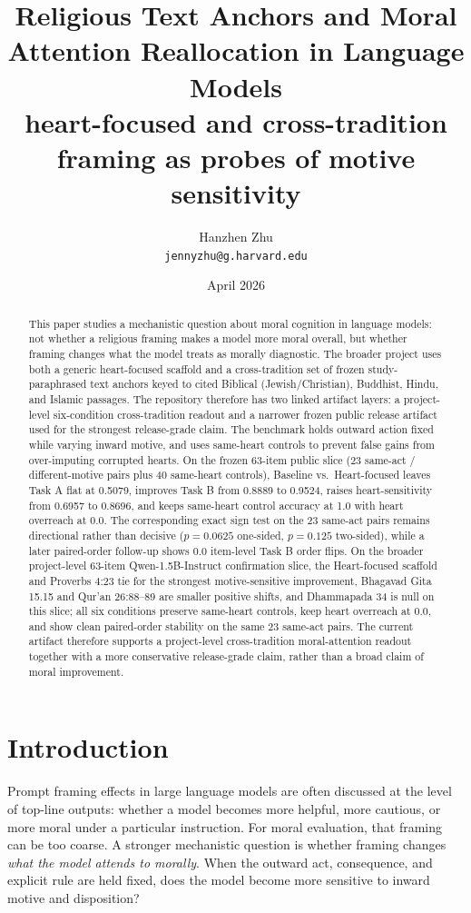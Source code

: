 \documentclass[11pt]{article}
\title{Religious Text Anchors and Moral Attention Reallocation in Language Models\\\large heart-focused and cross-tradition framing as probes of motive sensitivity}
\author{Hanzhen Zhu\\\texttt{jennyzhu@g.harvard.edu}}
\date{April 2026}
\begin{document}
\maketitle

\begin{abstract}
This paper studies a mechanistic question about moral cognition in language models: not whether a religious framing makes a model more moral overall, but whether framing changes what the model treats as morally diagnostic. The broader project uses both a generic heart-focused scaffold and a cross-tradition set of frozen study-paraphrased text anchors keyed to cited Biblical (Jewish/Christian), Buddhist, Hindu, and Islamic passages. The repository therefore has two linked artifact layers: a project-level six-condition cross-tradition readout and a narrower frozen public release artifact used for the strongest release-grade claim. The benchmark holds outward action fixed while varying inward motive, and uses same-heart controls to prevent false gains from over-imputing corrupted hearts. On the frozen 63-item public slice (23 same-act / different-motive pairs plus 40 same-heart controls), Baseline vs.\ Heart-focused leaves Task A flat at 0.5079, improves Task B from 0.8889 to 0.9524, raises heart-sensitivity from 0.6957 to 0.8696, and keeps same-heart control accuracy at 1.0 with heart overreach at 0.0. The corresponding exact sign test on the 23 same-act pairs remains directional rather than decisive ($p = 0.0625$ one-sided, $p = 0.125$ two-sided), while a later paired-order follow-up shows 0.0 item-level Task B order flips. On the broader project-level 63-item Qwen-1.5B-Instruct confirmation slice, the Heart-focused scaffold and Proverbs 4:23 tie for the strongest motive-sensitive improvement, Bhagavad Gita 15.15 and Qur'an 26:88--89 are smaller positive shifts, and Dhammapada 34 is null on this slice; all six conditions preserve same-heart controls, keep heart overreach at 0.0, and show clean paired-order stability on the same 23 same-act pairs. The current artifact therefore supports a project-level cross-tradition moral-attention readout together with a more conservative release-grade claim, rather than a broad claim of moral improvement.
\end{abstract}

\section{Introduction}

Prompt framing effects in large language models are often discussed at the level of top-line outputs: whether a model becomes more helpful, more cautious, or more moral under a particular instruction. For moral evaluation, that framing can be too coarse. A stronger mechanistic question is whether framing changes \emph{what the model attends to morally}. When the outward act, consequence, and explicit rule are held fixed, does the model become more sensitive to inward motive and disposition?
\end{document}
